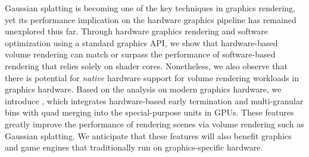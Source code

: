
Gaussian splatting is becoming one of the key techniques in graphics rendering,
yet its performance implication on the hardware graphics pipeline has remained
unexplored thus far.
%
Through hardware graphics rendering and software optimization using a standard
graphics API, we show that hardware-based volume rendering can match or surpass
the performance of software-based rendering that relies solely on shader cores.
%
Nonetheless, we also observe that there is potential for \emph{native} hardware
support for volume rendering workloads in graphics hardware.
%
Based on the analysis on modern graphics hardware, we introduce \name{}, which
integrates hardware-based early termination and multi-granular bins with quad
merging into the special-purpose units in GPUs. These features greatly
improve the performance of rendering scenes via volume rendering such as
Gaussian splatting. 
%
We anticipate that these features will also benefit graphics and game engines
that traditionally run on graphics-specific hardware.
